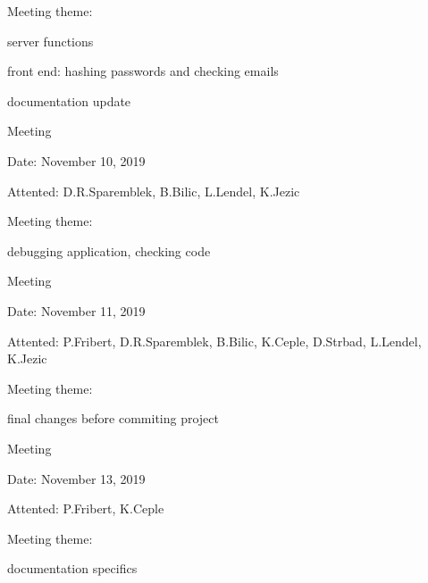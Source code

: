 \begin{packed_enum}
\begin{packed_item}
				\item Meeting theme:
				\begin{packed_item}
					\item  server functions
					\item  front end: hashing passwords and checking emails
					\item  documentation update
				\end{packed_item}
			\end{packed_item}
			\item  Meeting
			\item[] \begin{packed_item}
				\item Date: November 10, 2019
				\item Attented: D.R.Sparemblek, B.Bilic, L.Lendel, K.Jezic
				\item Meeting theme:
				\begin{packed_item}
					\item  debugging application, checking code
				\end{packed_item}
			\end{packed_item}
			\item  Meeting
			\item[] \begin{packed_item}
				\item Date: November 11, 2019
				\item Attented: P.Fribert, D.R.Sparemblek, B.Bilic, K.Ceple, D.Strbad, L.Lendel, K.Jezic
				\item Meeting theme:
				\begin{packed_item}
					\item  final changes before commiting project
				\end{packed_item}
			\end{packed_item}
			\item  Meeting
			\item[] \begin{packed_item}
				\item Date: November 13, 2019
				\item Attented: P.Fribert, K.Ceple
				\item Meeting theme:
				\begin{packed_item}
					\item  documentation specifics
				\end{packed_item}
			\end{packed_item}
			
			
			
			
		\end{packed_enum}
		
